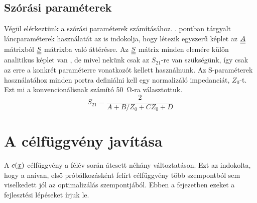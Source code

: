 	\subsection{Szórási paraméterek}
        Végül elérkeztünk a szórási paraméterek számításához. . pontban tárgyalt láncparaméterek használatát az is indokolja, hogy létezik egyszerű képlet az $\underline{\underline{A}}$ mátrixból $\underline{\underline{S}}$ mátrixba való áttérésre. Az $\underline{\underline{S}}$ mátrix minden elemére külön analitikus képlet van \cite{lancpar_spar}, de mivel nekünk csak az $S_{21}$-re van szükségünk, így csak az erre a konkrét paraméterre vonatkozót kellett használnunk. Az S-paraméterek használatához minden portra definiálni kell egy normalizáló impedanciát, $Z_0$-t. Ezt mi a konvencionálisnak számító \qty{50}{\ohm}-ra választottuk. 
    \begin{equation}
        S_{21} = \dfrac{2}{A+B/Z_0+CZ_0+D}
    \end{equation}
\section{A célfüggvény javítása}
    \label{sec:celfuggveny_javitas}
    A $c(\underline{x})$ célfüggvény a félév során átesett néhány változtatáson. Ezt az indokolta, hogy a naívan, első próbálkozásként felírt célfüggvény több szempontból sem viselkedett jól az optimalizálás szempontjából. Ebben a fejezetben ezeket a fejlesztési lépéseket írjuk le.
